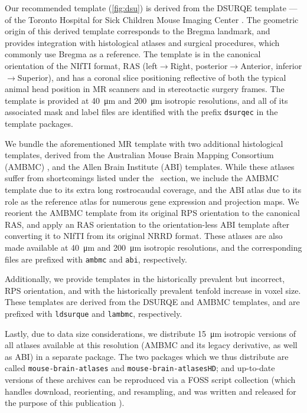 Our recommended template (\cref{fig:dsu}) is derived from the DSURQE template --- of the Toronto Hospital for Sick Children Mouse Imaging Center \cite{dsu}.
The geometric origin of this derived template corresponds to the Bregma landmark, and provides integration with histological atlases and surgical procedures, which commonly use Bregma as a reference.
The template is in the canonical orientation of the NIfTI format, RAS (left$\rightarrow$Right, posterior$\rightarrow$Anterior, inferior$\rightarrow$Superior), and has a coronal slice positioning reflective of both the typical animal head position in MR scanners and in stereotactic surgery frames.
The template is provided at \SI{40}{\micro\meter} and \SI{200}{\micro\meter} isotropic resolutions,
and all of its associated mask and label files are identified with the prefix \textcolor{mg}{\texttt{dsurqec}} in the template packages.

We bundle the aforementioned MR template with two additional histological templates, derived from the Australian Mouse Brain Mapping Consortium (AMBMC) \cite{amb}, and the Allen Brain Institute (ABI) \cite{abi} templates.
While these atlases suffer from shortcomings listed under the ~section, we include the AMBMC template due to its extra long rostrocaudal coverage, and the ABI atlas due to its role as the reference atlas for numerous gene expression and projection maps.
We reorient the AMBMC template from its original RPS orientation to the canonical RAS, and apply an RAS orientation to the orientation-less ABI template after converting it to NIfTI from its original NRRD format.
These atlases are also made available at \SI{40}{\micro\meter} and \SI{200}{\micro\meter} isotropic resolutions, and the corresponding files are prefixed with \textcolor{mg}{\texttt{ambmc}} and \textcolor{mg}{\texttt{abi}}, respectively.

Additionally, we provide templates in the historically prevalent but incorrect, RPS orientation, and with the historically prevalent tenfold increase in voxel size.
These templates are derived from the DSURQE and AMBMC templates, and are prefixed with \textcolor{mg}{\texttt{ldsurque}} and \textcolor{mg}{\texttt{lambmc}}, respectively.

Lastly, due to data size considerations, we distribute \SI{15}{\micro\meter} isotropic versions of all atlases available at this resolution (AMBMC and its legacy derivative, as well as ABI) in a separate package.
The two packages which we thus distribute are called \textcolor{mg}{\texttt{mouse-brain-atlases}} and \textcolor{mg}{\texttt{mouse-brain-atlasesHD}};
and up-to-date versions of these archives can be reproduced via a FOSS script collection (which handles download, reorienting, and resampling, and was written and released for the purpose of this publication \cite{atlases_generator}).

